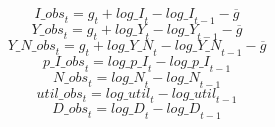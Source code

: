 \begin{dmath}
{I\_obs}_{t}={{g}}_{t}+{log\_I}_{t}-{log\_I}_{t-1}-{{\overline{g}}}
\end{dmath}
\begin{dmath}
{Y\_obs}_{t}={{g}}_{t}+{log\_Y}_{t}-{log\_Y}_{t-1}-{{\overline{g}}}
\end{dmath}
\begin{dmath}
{Y\_N\_obs}_{t}={{g}}_{t}+{log\_Y\_N}_{t}-{log\_Y\_N}_{t-1}-{{\overline{g}}}
\end{dmath}
\begin{dmath}
{p\_I\_obs}_{t}={log\_p\_I}_{t}-{log\_p\_I}_{t-1}
\end{dmath}
\begin{dmath}
{N\_obs}_{t}={log\_N}_{t}-{log\_N}_{t-1}
\end{dmath}
\begin{dmath}
{util\_obs}_{t}={log\_util}_{t}-{log\_util}_{t-1}
\end{dmath}
\begin{dmath}
{D\_obs}_{t}={log\_D}_{t}-{log\_D}_{t-1}
\end{dmath}
